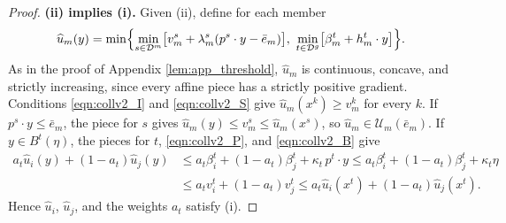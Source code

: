 \documentclass[11 pt]{article}
\begin{document}
\begin{proof}
\textbf{(ii) implies (i).} Given (ii), define for each member
\begin{align}\label{eqn:app_envelope}
\widehat u_{m}(y) = \min \Bigl\{ \min_{s \in \mathcal{D}^{m}} \bigl[ v_{m}^{s} + \lambda_{m}^{s} (p^{s} \cdot y - \bar e_{m}) \bigr],\ \min_{t \in \mathcal{D}^{g}} \bigl[ \beta_{m}^{t} + h_{m}^{t} \cdot y \bigr] \Bigr\}.
\end{align}
As in the proof of Appendix \autoref{lem:app_threshold}, $\widehat u_{m}$ is continuous, concave, and strictly increasing, since every affine piece has a strictly positive gradient. Conditions \eqref{eqn:collv2_I} and \eqref{eqn:collv2_S} give $\widehat u_{m}(x^{k}) \geq v_{m}^{k}$ for every $k$. If $p^{s} \cdot y \leq \bar e_{m}$, the piece for $s$ gives $\widehat u_{m}(y) \leq v_{m}^{s} \leq \widehat u_{m}(x^{s})$, so $\widehat u_{m} \in \mathcal{U}_{m}(\bar e_{m})$. If $y \in B^{t}(\eta)$, the pieces for $t$, \eqref{eqn:collv2_P}, and \eqref{eqn:collv2_B} give
\begin{align*}
a_{t} \widehat u_{i}(y) + (1-a_{t}) \widehat u_{j}(y)
&\leq a_{t} \beta_{i}^{t} + (1-a_{t}) \beta_{j}^{t} + \kappa_{t}\, p^{t} \cdot y
\leq a_{t} \beta_{i}^{t} + (1-a_{t}) \beta_{j}^{t} + \kappa_{t} \eta \\
&\leq a_{t} v_{i}^{t} + (1-a_{t}) v_{j}^{t}
\leq a_{t} \widehat u_{i}(x^{t}) + (1-a_{t}) \widehat u_{j}(x^{t}).
\end{align*}
Hence $\widehat u_{i}$, $\widehat u_{j}$, and the weights $a_{t}$ satisfy (i).


\end{proof}
\end{document}
